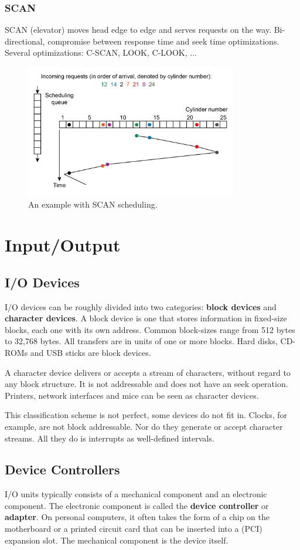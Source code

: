 \documentclass[11pt,a4paper]{article}
\begin{document}
\subsubsection{SCAN}
SCAN (elevator) moves head edge to edge and serves requests on the way. Bi-directional, compromise between response time and seek time optimizations. Several optimizations: C-SCAN, LOOK, C-LOOK, $\dots$
\begin{figure}[h!]
	\centering
		\includegraphics[width=350px]{img/scan-01.png}
	\caption{An example with SCAN scheduling.}
\end{figure}

\section{Input/Output}
\subsection{I/O Devices}
I/O devices can be roughly divided into two categories: \textbf{block devices} and \textbf{character devices}. A block device is one that stores information in fixed-size blocks, each one with its own address. Common block-sizes range from 512 bytes to 32,768 bytes. All transfers are in units of one or more blocks. Hard disks, CD-ROMs and USB sticks are block devices. 

A character device delivers or accepts a stream of characters, without regard to any block structure. It is not addressable and does not have an seek operation. Printers, network interfaces and mice can be seen as character devices. 

This classification scheme is not perfect, some devices do not fit in. Clocks, for example, are not block addressable. Nor do they generate or accept character streams. All they do is interrupts as well-defined intervals. 

\subsection{Device Controllers}
I/O units typically consists of a mechanical component and an electronic component. The electronic component is called the \textbf{device controller} or \textbf{adapter}. On personal computers, it often takes the form of a chip on the motherboard or a printed circuit card that can be inserted into a (PCI) expansion slot. The mechanical component is the device itself. 
\end{document}
